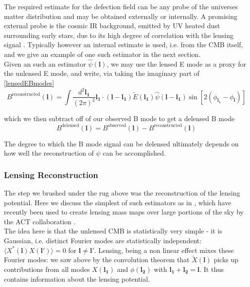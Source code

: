 \documentclass[a4paper,10pt]{article}
\renewcommand{\v}[1]{\mathbf{#1}}
\newcommand{\finttwo}[1]{\int \frac{d^2 \v{#1}}{(2\pi)^2}}
\begin{document}
The required estimate for the defection field can be any probe of the universes matter distribution and may be obtained externally or internally. A promising external probe is the cosmic IR background, emitted by UV heated dust surrounding early stars, due to its high degree of correlation with the lensing signal \cite{sherwin}. Typically however an internal estimate is used, i.e. from the CMB itself, and we give an example of one such estimator in the next section. \\

Given an such an estimator $\hat{\psi}(\v{l})$, we may use the lensed E mode as a proxy for the unlensed E mode, and write, via taking the imaginary part of \ref{lensedEBmodes}
\begin{equation}
B^{\text{reconstructed}}(\v{l}) = \finttwo{l_1} \v{l_1}\cdot(\v{l}-\v{l_1}) \tilde{E}(\v{l_1})\hat{\psi}(\v{l}-\v{l_1})\sin[2(\phi_\v{l_1}-\phi_\v{l})]
\label{sin}
\end{equation} 

which we then subtract off of our observed B mode to get a delensed B mode
\begin{equation}
B^{\text{delensed}}(\v{l}) = B^{\text{observed}}(\v{l}) - B^{\text{reconstructed}}(\v{l})
\end{equation}

The degree to which the B mode signal can be delensed ultimately depends on how well the reconstruction of $\psi$ can be accomplished. 

\subsubsection{Lensing Reconstruction}

The step we brushed under the rug above was the reconstruction of the lensing potential. Here we discuss the simplest of such estimators as in \cite{hu-estimator,lewis}, which have recently been used to create lensing mass maps over large portions of the sky by the ACT collaboration \cite{darwish}. \\

The idea here is that the unlensed CMB is statistically very simple - it is Gaussian, i.e. distinct Fourier modes are statistically independent: $\langle X^*(\v{l})X(\v{l'})\rangle =0$ for  $\v{l} \neq \v{l'}$. Lensing, being a non linear effect mixes these Fourier modes: we saw above by the convolution theorem that  $\tilde{X}(\v{l})$ picks up contributions from all modes ${X}(\v{l_1})$ and $\phi(\v{l_2})$ with $\v{l_1}+\v{l_2}=\v{l}$. It thus contains information about the lensing potential.\\
\end{document}
